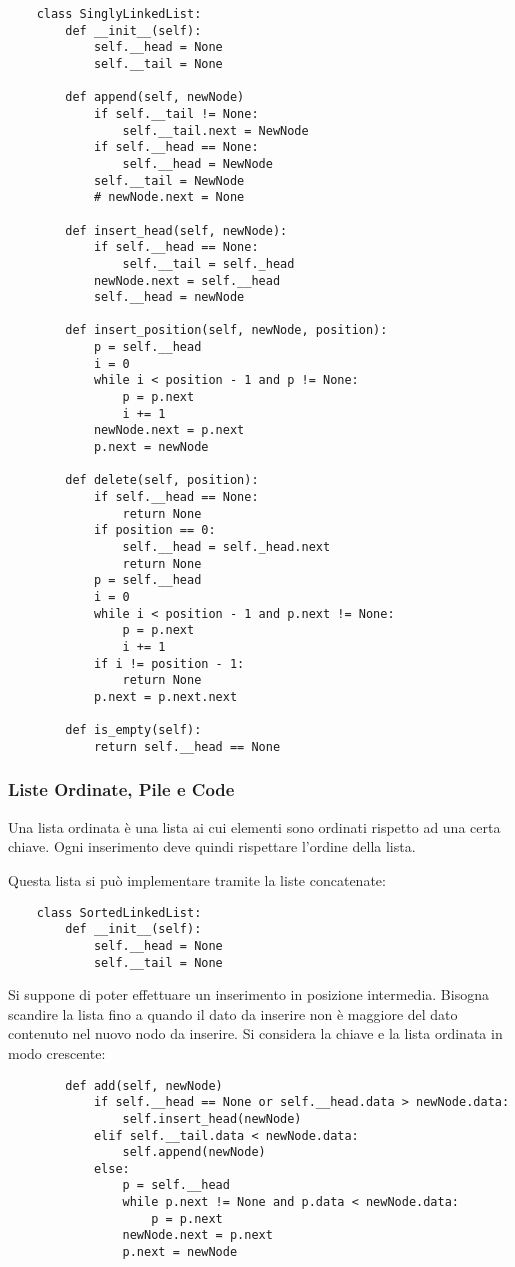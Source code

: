 \documentclass{article}
\numberwithin{equation}{subsection}
\begin{document}
\begin{verbatim}
    class SinglyLinkedList:
        def __init__(self):
            self.__head = None
            self.__tail = None

        def append(self, newNode)
            if self.__tail != None:
                self.__tail.next = NewNode
            if self.__head == None:
                self.__head = NewNode
            self.__tail = NewNode
            # newNode.next = None

        def insert_head(self, newNode):
            if self.__head == None:
                self.__tail = self._head
            newNode.next = self.__head
            self.__head = newNode

        def insert_position(self, newNode, position):
            p = self.__head
            i = 0
            while i < position - 1 and p != None:
                p = p.next
                i += 1
            newNode.next = p.next
            p.next = newNode

        def delete(self, position):
            if self.__head == None:
                return None
            if position == 0:
                self.__head = self._head.next
                return None
            p = self.__head
            i = 0
            while i < position - 1 and p.next != None:
                p = p.next
                i += 1
            if i != position - 1:
                return None
            p.next = p.next.next
            
        def is_empty(self):
            return self.__head == None
\end{verbatim}

\subsubsection{Liste Ordinate, Pile e Code}
\label{sec:lista_ordinata}

Una lista ordinata è una lista ai cui elementi sono ordinati rispetto ad una certa chiave. 
Ogni inserimento deve quindi rispettare l'ordine della lista. 

Questa lista si può implementare tramite la liste concatenate:
\begin{verbatim}    
    class SortedLinkedList:
        def __init__(self):
            self.__head = None
            self.__tail = None
\end{verbatim}

Si suppone di poter effettuare un inserimento in posizione intermedia. Bisogna scandire la 
lista fino a quando il dato da inserire non è maggiore del dato contenuto nel nuovo nodo 
da inserire. Si considera la chiave e la lista ordinata in modo crescente:
\begin{verbatim}
        def add(self, newNode)
            if self.__head == None or self.__head.data > newNode.data:
                self.insert_head(newNode)
            elif self.__tail.data < newNode.data:
                self.append(newNode)
            else: 
                p = self.__head
                while p.next != None and p.data < newNode.data:
                    p = p.next
                newNode.next = p.next
                p.next = newNode
\end{verbatim}
\end{document}
